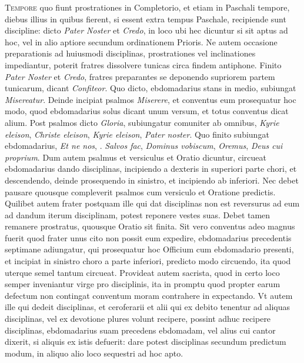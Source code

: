 \begin{multicols*}{2}
{\color{Red} }
\lettrine[lines=2]{\zallmancaps \color{Blue} T}{empore} quo fiunt prostrationes in Completorio, et etiam in Paschali tempore, diebus illius in quibus fierent, si essent extra tempus Paschale, recipiende sunt discipline: dicto \textit{Pater Noster} et \textit{Credo}, in loco ubi hec dicuntur si sit aptus ad hoc, vel in alio aptiore secundum ordinationem Prioris. Ne autem occasione preparationis ad huiusmodi disciplinas, prostrationes vel inclinationes impediantur, poterit fratres dissolvere tunicas circa findem antiphone. Finito \textit{Pater Noster} et \textit{Credo}, fratres preparantes se deponendo supriorem partem tunicarum, dicant \textit{Confiteor}. Quo dicto, ebdomadarius stans in medio, subiungat \textit{Misereatur}. Deinde incipiat psalmos \textit{Miserere}, et conventus eum prosequatur hoc modo, quod ebdomadarius solus dicant unum versum, et totus conventus dicat alium. Post psalmos dicto \textit{Gloria}, subiungatur comuniter ab omnibus, \textit{Kyrie eleison}, \textit{Christe eleison}, \textit{Kyrie eleison}, \textit{Pater noster}.
Quo finito subiungat ebdomadarius, \textit{Et ne nos}, \Vbar . \textit{Salvos fac}, \textit{Dominus vobiscum}, \textit{Oremus}, \textit{Deus cui proprium}. Dum autem psalmus et versiculus et Oratio dicuntur, circueat ebdomadarius dando disciplinas, incipiendo a dexteris in superiori parte chori, et descendendo, deinde prosequendo in sinistro, et incipiendo ab inferiori. Nec debet pausare quousque compleverit psalmos cum versiculo et Oratione predictis. Quilibet autem frater postquam ille qui dat disciplinas non est reversurus ad eum ad dandum iterum disciplinam, potest reponere vestes suas. Debet tamen remanere prostratus, quousque Oratio sit finita.
Sit vero conventus adeo magnus fuerit quod frater unus cito non possit eum expedire, ebdomadarius precedentis septimane adiungatur, qui prosequatur hoc Officium cum ebdomadario presenti, et incipiat in sinistro choro a parte inferiori, predicto modo circuendo, ita quod uterque semel tantum circueat. Provideat autem sacrista, quod in certo loco semper inveniantur virge pro disciplinis, ita in promptu quod propter earum defectum non contingat conventum moram contrahere in expectando.
Vt autem ille qui dedeit disciplinas, et ceroferarii et alii qui ex debito tenentur ad aliquas disciplinas, vel ex devotione plures volunt recipere, possint adhuc recipere disciplinas, ebdomadarius suam precedens ebdomadam, vel alius cui cantor dixerit, si aliquis ex istis defuerit: dare potest disciplinas secundum predictum modum, in aliquo alio loco sequestri ad hoc apto.


\end{multicols*}
